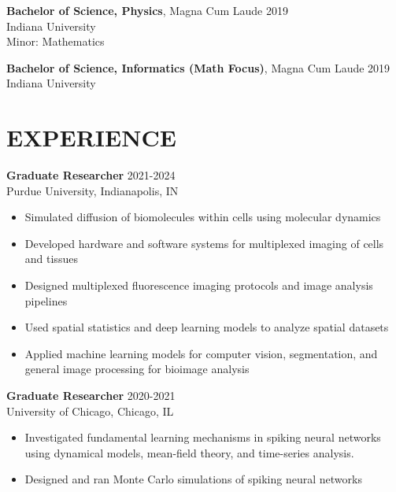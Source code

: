 \documentclass[margin, 10pt]{res} %
\begin{document}
\begin{resume}
\textbf{Bachelor of Science, Physics}, Magna Cum Laude \hfill 2019\\
Indiana University\\
Minor: Mathematics 

\textbf{Bachelor of Science, Informatics (Math Focus)}, Magna Cum Laude \hfill 2019\\
Indiana University\\


 
\section{EXPERIENCE}

\textbf{Graduate Researcher} \hfill 2021-2024 \\
Purdue University, Indianapolis, IN

\begin{itemize} \itemsep -2pt %

\item Simulated diffusion of biomolecules within cells using molecular dynamics
\item Developed hardware and software systems for multiplexed imaging of cells and tissues
\item Designed multiplexed fluorescence imaging protocols and image analysis pipelines
\item Used spatial statistics and deep learning models to analyze spatial datasets
\item Applied machine learning models for computer vision, segmentation, and general image processing for bioimage analysis

\end{itemize}

\textbf{Graduate Researcher} \hfill 2020-2021 \\
University of Chicago, Chicago, IL

\begin{itemize} \itemsep -2pt %

\item Investigated fundamental learning mechanisms in spiking neural networks using dynamical models, mean-field theory, and time-series analysis. 

\item Designed and ran Monte Carlo simulations of spiking neural networks 
 

\end{itemize}
\end{resume}
\end{document}
